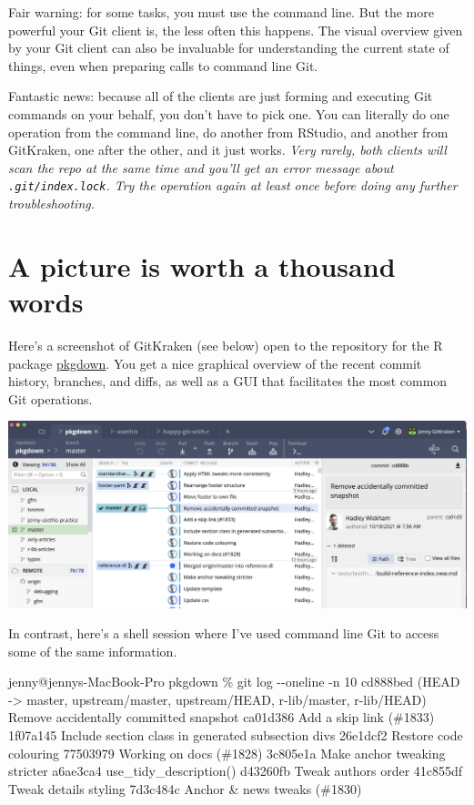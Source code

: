 \documentclass[
]{book}
\newenvironment{Shaded}{\begin{snugshade}}{\end{snugshade}}
\newcommand{\NormalTok}[1]{#1}
\begin{document}
Fair warning: for some tasks, you must use the command line. But the more powerful your Git client is, the less often this happens. The visual overview given by your Git client can also be invaluable for understanding the current state of things, even when preparing calls to command line Git.

Fantastic news: because all of the clients are just forming and executing Git commands on your behalf, you don't have to pick one.
You can literally do one operation from the command line, do another from RStudio, and another from GitKraken, one after the other, and it just works.
\emph{Very rarely, both clients will scan the repo at the same time and you'll get an error message about \texttt{.git/index.lock}.
Try the operation again at least once before doing any further troubleshooting.}

\section{A picture is worth a thousand words}\label{a-picture-is-worth-a-thousand-words}

Here's a screenshot of GitKraken (see below) open to the repository for the R package \href{https://pkgdown.r-lib.org}{pkgdown}.
You get a nice graphical overview of the recent commit history, branches, and diffs, as well as a GUI that facilitates the most common Git operations.

\begin{center}\includegraphics[width=1\linewidth]{img/gitkraken-pkgdown-screenshot} \end{center}

In contrast, here's a shell session where I've used command line Git to access some of the same information.

\begin{Shaded}
\begin{Highlighting}[]
\NormalTok{jenny@jennys{-}MacBook{-}Pro pkgdown \% git log {-}{-}oneline {-}n 10}
\NormalTok{cd888bed (HEAD {-}\textgreater{} master, upstream/master, upstream/HEAD, r{-}lib/master, r{-}lib/HEAD) Remove accidentally committed snapshot}
\NormalTok{ca01d386 Add a skip link (\#1833)}
\NormalTok{1f07a145 Include section class in generated subsection divs}
\NormalTok{26e1dcf2 Restore code colouring}
\NormalTok{77503979 Working on docs (\#1828)}
\NormalTok{3c805e1a Make anchor tweaking stricter}
\NormalTok{a6ae3ca4 use\_tidy\_description()}
\NormalTok{d43260fb Tweak authors order}
\NormalTok{41c855df Tweak details styling}
\NormalTok{7d3c484c Anchor \& news tweaks (\#1830)}
\end{Highlighting}
\end{Shaded}
\end{document}
